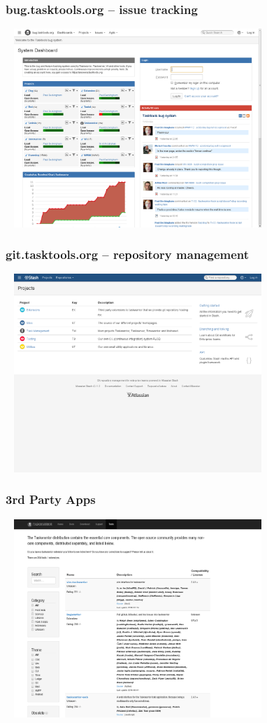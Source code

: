\documentclass[t]{beamer}
\begin{document}
\begin{frame}\frametitle{bug.tasktools.org -- issue tracking}
    \begin{center}
        \href{https://bug.tasktools.org/}{\includegraphics[width=10cm,height=7.5cm]{bug-tasktools-org.png}}
    \end{center}
\end{frame}

\begin{frame}\frametitle{git.tasktools.org -- repository management}
    \begin{center}
        \href{https://git.tasktools.org/}{\includegraphics[width=10cm,height=7.5cm]{git-tasktools-org.png}}
    \end{center}
\end{frame}

\begin{frame}\frametitle{3rd Party Apps}
    \begin{center}
        \href{http://taskwarrior.org/tools/}{\includegraphics[width=10cm,height=7.5cm]{3rdparty.png}}
    \end{center}
\end{frame}
\end{document}
